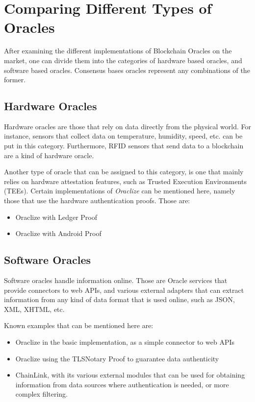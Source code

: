 \chapter{Comparing Different Types of Oracles}
\label{cha:types_of_oracles}
After examining the different implementations of Blockchain Oracles on the market, one can divide them into the categories of hardware based oracles, and software based oracles. Consensus bases oracles represent any combinations of the former.
\section{Hardware Oracles}
Hardware oracles are those that rely on data directly from the physical world. For instance, sensors that collect data on temperature, humidity, speed, etc. can be put in this category. Furthermore, RFID sensors that send data to a blockchain are a kind of hardware oracle.

Another type of oracle that can be assigned to this category, is one that mainly relies on hardware attestation features, such as Trusted Execution Environments (TEEs). Certain implementations of \emph{Oraclize} can be mentioned here, namely those that use the hardware authentication proofs. Those are:
\begin{itemize}
	\item Oraclize with Ledger Proof
	\item Oraclize with Android Proof
\end{itemize}
\section{Software Oracles}
Software oracles handle information online. Those are Oracle services that provide connectors to web APIs, and various external adapters that can extract information from any kind of data format that is used online, such as JSON, XML, XHTML, etc.

Known examples that can be mentioned here are:
\begin{itemize}
	\item Oraclize in the basic implementation, as a simple connector to web APIs
	\item Oraclize using the TLSNotary Proof to guarantee data authenticity
	\item ChainLink, with its various external modules that can be used for obtaining information from data sources where authentication is needed, or more complex filtering.
\end{itemize}
